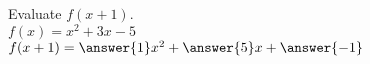 \documentclass{ximera}
\author{David Kish}
\begin{document}
\begin{exercise}
Evaluate $f(x+1)$.\\
$f(x)= x^2+ 3x-5$\\
$f(x+1)= \answer{1}x^2+\answer{5}x+\answer{-1}$
\end{exercise}
\end{document}
